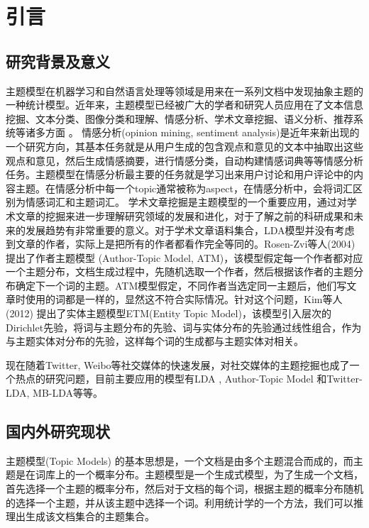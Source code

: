 \chapter{引言}

\section{研究背景及意义}
主题模型在机器学习和自然语言处理等领域是用来在一系列文档中发现抽象主题的一种统计模型。近年来，主题模型已经被广大的学者和研究人员应用在了文本信息挖掘、文本分类、图像分类和理解、情感分析、学术文章挖掘、语义分析、推荐系统等诸多方面 \cite{leskovec2009meme, wang2012tm, 008:labeledlda, 2011:xuge, 011:mblda}。
情感分析(opinion mining,  sentiment analysis)是近年来新出现的一个研究方向，其基本任务就是从用户生成的包含观点和意见的文本中抽取出这些观点和意见，然后生成情感摘要，进行情感分类，自动构建情感词典等等情感分析任务。主题模型在情感分析最主要的任务就是学习出来用户讨论和用户评论中的内容主题。在情感分析中每一个topic通常被称为aspect，在情感分析中，会将词汇区别为情感词汇和主题词汇。
学术文章挖掘是主题模型的一个重要应用，通过对学术文章的挖掘来进一步理解研究领域的发展和进化，对于了解之前的科研成果和未来的发展趋势有非常重要的意义。对于学术文章语料集合，LDA模型并没有考虑到文章的作者，实际上是把所有的作者都看作完全等同的。Rosen-Zvi等人(2004) \cite{rosen2004author} 提出了作者主题模型 (Author-Topic Model, ATM)，该模型假定每一个作者都对应一个主题分布，文档生成过程中，先随机选取一个作者，然后根据该作者的主题分布确定下一个词的主题。ATM模型假定，不同作者当选定同一主题后，他们写文章时使用的词都是一样的，显然这不符合实际情况。针对这个问题，Kim等人(2012) \cite{Kim:2012} 提出了实体主题模型ETM(Entity Topic Model)，该模型引入层次的Dirichlet先验，将词与主题分布的先验、词与实体分布的先验通过线性组合，作为与主题实体对分布的先验，这样每个词的生成都与主题实体对相关。

现在随着Twitter, Weibo等社交媒体的快速发展，对社交媒体的主题挖掘也成了一个热点的研究问题，目前主要应用的模型有LDA \cite{Blei:2003}, Author-Topic Model\cite{rosen2004author} 和Twitter-LDA\cite{zhao2011comparing}, MB-LDA\cite{011:mblda}等等。

\section{国内外研究现状}
主题模型(Topic Models) \cite{steyvers2007probabilistic} 的基本思想是，一个文档是由多个主题混合而成的，而主题是在词库上的一个概率分布。主题模型是一个生成式模型，为了生成一个文档，首先选择一个主题的概率分布，然后对于文档的每个词，根据主题的概率分布随机的选择一个主题，并从该主题中选择一个词。利用统计学的一个方法，我们可以推理出生成该文档集合的主题集合。


